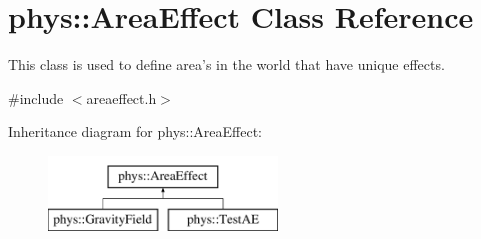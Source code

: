 \hypertarget{classphys_1_1AreaEffect}{
\section{phys::AreaEffect Class Reference}
\label{d4/d55/classphys_1_1AreaEffect}
}


This class is used to define area's in the world that have unique effects.  




{\ttfamily \#include $<$areaeffect.h$>$}

Inheritance diagram for phys::AreaEffect:\begin{figure}[H]
\begin{center}
\leavevmode
\includegraphics[height=2cm]{d4/d55/classphys_1_1AreaEffect}
\end{center}
\end{figure}
